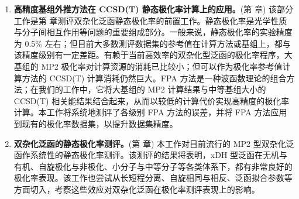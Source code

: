\begin{enumerate}[nosep]
  \item \textbf{高精度基组外推方法在 CCSD(T) 静态极化率计算上的应用。}(第  章) 该部分工作是第  章测评双杂化泛函静态极化率的前置工作。静态极化率是光学性质与分子间相互作用等问题的重要组成部分。一般来说，静态极化率的实验精度为 0.5\% 左右；但目前大多数测评数据集的参考值在计算方法或基组上，都与该精度级别有一定差距。有赖于当前高效率的双杂化型泛函的极化率程序，大基组的 MP2 极化率对计算资源的消耗已比较小；但可以作为极化率参考值计算方法的 CCSD(T) 计算消耗仍然巨大。FPA 方法是一种波函数理论的组合方法；在我们的工作中，它将大基组的 MP2 计算结果与中等基组大小的 CCSD(T) 相关能结果结合起来，从而以较低的计算代价实现高精度的极化率计算。本工作将系统地测评了各级别 FPA 方法的误差，并将 FPA 方法应用到现有的极化率数据集，以提升数据集精度。
  
  \item \textbf{双杂化泛函的静态极化率测评。}(第  章) 本工作对目前流行的 MP2 型双杂化泛函作系统性的静态极化率测评。该测评的结果将表明，xDH 型泛函在无机与有机、自旋极化与非极化、小分子与中等分子等各类体系下，都有非常良好的极化率表现。该工作也尝试从长短程分离、自旋相同与相反、泛函拟合参数等方面切入，考察这些效应对双杂化泛函在极化率测评表现上的影响。
  
\end{enumerate}

\newpage

